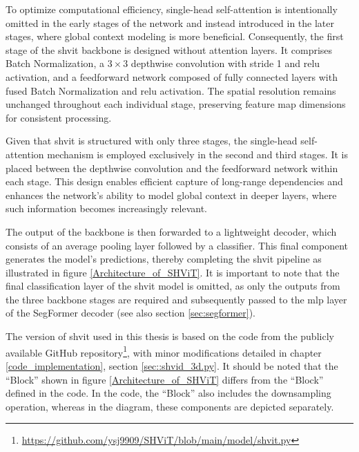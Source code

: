 To optimize computational efficiency, single-head self-attention is intentionally omitted in the early stages of the network and instead introduced in the later stages, where global context modeling is more beneficial. Consequently, the first stage of the \gls{shvit} backbone is designed without attention layers. It comprises Batch Normalization, a $3 \times 3$ depthwise convolution with stride 1 and \gls{relu} activation, and a feedforward network composed of fully connected layers with fused Batch Normalization and \gls{relu} activation. The spatial resolution remains unchanged throughout each individual stage, preserving feature map dimensions for consistent processing.

\medskip

Given that \gls{shvit} is structured with only three stages, the single-head self-attention mechanism is employed exclusively in the second and third stages. It is placed between the depthwise convolution and the feedforward network within each stage. This design enables efficient capture of long-range dependencies and enhances the network's ability to model global context in deeper layers, where such information becomes increasingly relevant. 

\medskip

The output of the backbone is then forwarded to a lightweight decoder, which consists of an average pooling layer followed by a classifier. This final component generates the model's predictions, thereby completing the \gls{shvit} pipeline as illustrated in figure \ref{Architecture_of_SHViT}. It is important to note that the final classification layer of the \gls{shvit} model is omitted, as only the outputs from the three backbone stages are required and subsequently passed to the \gls{mlp} layer of the SegFormer decoder \cite{yun2024shvit} (see also section \ref{sec:segformer}).

\medskip

The version of \gls{shvit} used in this thesis is based on the code from the publicly available GitHub repository\footnote{\url{https://github.com/ysj9909/SHViT/blob/main/model/shvit.py}}, with minor modifications detailed in chapter \ref{code_implementation}, section \ref{sec::shvid_3d.py}. It should be noted that the \enquote{Block} shown in figure \ref{Architecture_of_SHViT} differs from the \enquote{Block} defined in the code. In the code, the \enquote{Block} also includes the downsampling operation, whereas in the diagram, these components are depicted separately.




